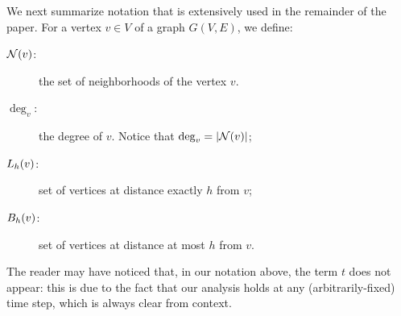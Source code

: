 We next summarize notation that is extensively used in the remainder of the paper. For a vertex $v \in V$ of a graph $G(V,E)$, we define:
    
    
    \begin{description} 
    \item[$\mathcal{N}(v)$:] the set of neighborhoods of the vertex $v$.
    \item[$\deg_v$:] the degree of $v$. Notice that $\deg_v = \vert \mathcal{N}(v) \vert$;
    \item[$L_h(v)$:] set of vertices at distance exactly $h$ from $v$;
    \item[$B_h(v)$:] set of vertices at distance at most $h$ from $v$. 
\end{description}

The reader may have noticed that, in our notation above, the term $t$ does not appear: this is due to the fact that our analysis holds at any (arbitrarily-fixed) time step, which  is always clear from context. 



 \fi 



